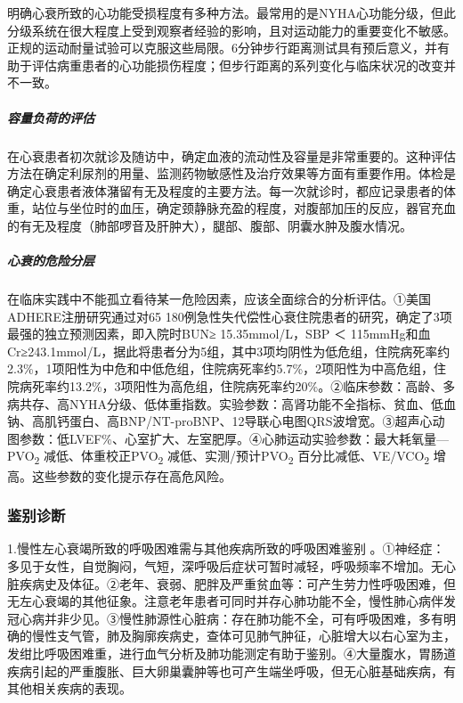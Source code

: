 明确心衰所致的心功能受损程度有多种方法。最常用的是NYHA心功能分级，但此分级系统在很大程度上受到观察者经验的影响，且对运动能力的重要变化不敏感。正规的运动耐量试验可以克服这些局限。6分钟步行距离测试具有预后意义，并有助于评估病重患者的心功能损伤程度；但步行距离的系列变化与临床状况的改变并不一致。

\subparagraph{容量负荷的评估}

在心衰患者初次就诊及随访中，确定血液的流动性及容量是非常重要的。这种评估方法在确定利尿剂的用量、监测药物敏感性及治疗效果等方面有重要作用。体检是确定心衰患者液体潴留有无及程度的主要方法。每一次就诊时，都应记录患者的体重，站位与坐位时的血压，确定颈静脉充盈的程度，对腹部加压的反应，器官充血的有无及程度（肺部啰音及肝肿大），腿部、腹部、阴囊水肿及腹水情况。

\subparagraph{心衰的危险分层}

在临床实践中不能孤立看待某一危险因素，应该全面综合的分析评估。①美国ADHERE注册研究通过对65
180例急性失代偿性心衰住院患者的研究，确定了3项最强的独立预测因素，即入院时BUN≥
15.35mmol/L，SBP ＜
115mmHg和血Cr≥243.1mmol/L，据此将患者分为5组，其中3项均阴性为低危组，住院病死率约2.3\%，1项阳性为中危和中低危组，住院病死率约5.7\%，2项阳性为中高危组，住院病死率约13.2\%，3项阳性为高危组，住院病死率约20\%。②临床参数：高龄、多病共存、高NYHA分级、低体重指数。实验参数：高肾功能不全指标、贫血、低血钠、高肌钙蛋白、高BNP/NT-proBNP、12导联心电图QRS波增宽。③超声心动图参数：低LVEF\%、心室扩大、左室肥厚。④心肺运动实验参数：最大耗氧量---PVO\textsubscript{2}
减低、体重校正PVO\textsubscript{2} 减低、实测/预计PVO\textsubscript{2}
百分比减低、VE/VCO\textsubscript{2}
增高。这些参数的变化提示存在高危风险。

\subsubsection{鉴别诊断}

1.慢性左心衰竭所致的呼吸困难需与其他疾病所致的呼吸困难鉴别
。①神经症：多见于女性，自觉胸闷，气短，深呼吸后症状可暂时减轻，呼吸频率不增加。无心脏疾病史及体征。②老年、衰弱、肥胖及严重贫血等：可产生劳力性呼吸困难，但无左心衰竭的其他征象。注意老年患者可同时并存心肺功能不全，慢性肺心病伴发冠心病并非少见。③慢性肺源性心脏病：存在肺功能不全，可有呼吸困难，多有明确的慢性支气管，肺及胸廓疾病史，查体可见肺气肿征，心脏增大以右心室为主，发绀比呼吸困难重，进行血气分析及肺功能测定有助于鉴别。④大量腹水，胃肠道疾病引起的严重腹胀、巨大卵巢囊肿等也可产生端坐呼吸，但无心脏基础疾病，有其他相关疾病的表现。

